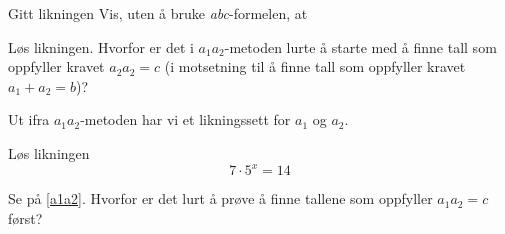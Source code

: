 






\opgt	

Gitt likningen
Vis, uten å bruke \textit{abc}-formelen, at

Løs likningen.
Hvorfor er det i $ a_1 a_2$-metoden lurte å starte med å finne tall som oppfyller kravet $ a_2a_2=c $ (i motsetning til å finne tall som oppfyller kravet $ a_1+a_2=b $)?

Ut ifra $ a_1a_2 $-metoden har vi et likningssett for $ a_1 $ og $ a_2 $.

Løs likningen 
\[7\cdot5^x=14 \]	
	
Se på \eqref{a1a2}. Hvorfor er det lurt å prøve å finne tallene som oppfyller $ a_1a_2 =c $ først?
